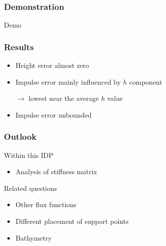 \documentclass{beamer}
\newcommand{\backupend}{
   \addtocounter{framenumbervorappendix}{-\value{framenumber}}
   \addtocounter{framenumber}{\value{framenumbervorappendix}}
}
\newcommand{\todo}[1]{
  \textcolor{red}{TODO: #1}
  \note{\textcolor{red}{TODO: #1}}
}
\renewcommand{\todo}[1]{}
\newcommand{\pd}[2]{\dfrac{\partial #1}{\partial #2}}
\renewcommand{\phi}{\varphi}
\begin{document}
\begin{frame}
  \frametitle{Demonstration}
  \begin{center}
    \Large{Demo}
  \end{center}
\end{frame}

\begin{frame}
  \frametitle{Results}
  \begin{itemize}
  \item Height error almost zero
  \item Impulse error mainly influenced by $h$ component

  $\rightarrow$ lowest near the average $h$ value
  \item Impulse error unbounded
  \end{itemize}
\end{frame}

\begin{frame}
  \frametitle{Outlook}
  \begin{block}{Within this IDP}
    \begin{itemize}
    \item Analysis of stiffness matrix
    \end{itemize}
  \end{block}
  \begin{block}{Related questions}
    \begin{itemize}
    \item Other flux functions \todo{Beispiele?}
    \item Different placement of support points
    \item Bathymetry
    \end{itemize}
  \end{block}
\end{frame}

\backupend
\end{document}
